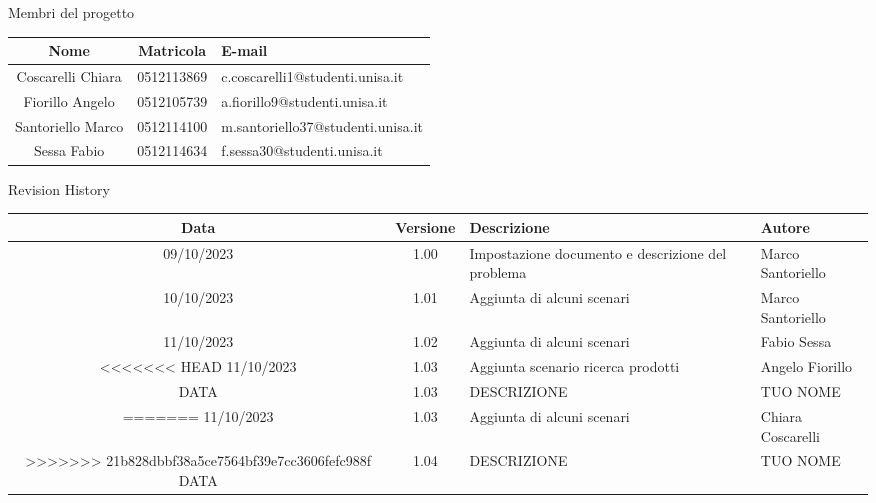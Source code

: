 \documentclass[12pt, a4paper, oneside]{book}
\begin{document}
    \newpage
    \begin{center}
    {\LARGE{Membri del progetto}}
    \end{center}
    \begin{center}
        \begin{tabular}{|c|c|m{8cm}|}
            \hline
            \cellcolor{lightgray} \textbf{Nome} & \cellcolor{lightgray} \textbf{Matricola} & \cellcolor{lightgray} \textbf{E-mail}\\ \hline
            Coscarelli  Chiara & 0512113869 & c.coscarelli1@studenti.unisa.it\\ \hline
            Fiorillo Angelo & 0512105739 & a.fiorillo9@studenti.unisa.it\\ \hline
            Santoriello Marco &  0512114100 & m.santoriello37@studenti.unisa.it\\ \hline
            Sessa Fabio & 0512114634 & f.sessa30@studenti.unisa.it\\ \hline
        \end{tabular}
    \end{center}

    \begin{center}
    {\LARGE{Revision History}}
    \end{center}

    \begin{center}
        \begin{tabular}{|c|c|m{8cm}|m{3.5cm}|}
            \hline
            \cellcolor{lightgray} \textbf{Data} & \cellcolor{lightgray} \textbf{Versione} & \cellcolor{lightgray} \textbf{Descrizione} & \cellcolor{lightgray} \textbf{Autore}\\ \hline
            09/10/2023 & 1.00 & Impostazione documento e descrizione del problema & Marco Santoriello\\ \hline
            10/10/2023 & 1.01 & Aggiunta di alcuni scenari & Marco Santoriello\\ \hline
            11/10/2023 & 1.02 & Aggiunta di alcuni scenari & Fabio Sessa\\ \hline
<<<<<<< HEAD
            11/10/2023 & 1.03 & Aggiunta scenario ricerca prodotti & Angelo Fiorillo\\ \hline
            DATA & 1.03 & DESCRIZIONE & TUO NOME\\ \hline
=======
            11/10/2023 & 1.03 & Aggiunta di alcuni scenari & Chiara Coscarelli\\ \hline
>>>>>>> 21b828dbbf38a5ce7564bf39e7cc3606fefc988f
            DATA & 1.04 & DESCRIZIONE & TUO NOME\\ \hline
        \end{tabular}
    \end{center}
\end{document}
